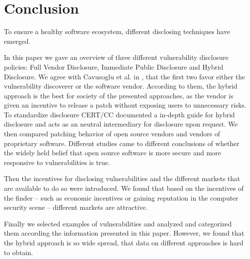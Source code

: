 \section{Conclusion}

To ensure a healthy software ecosystem, different disclosing techniques have emerged.

In this paper we gave an overview of three different vulnerability disclosure
policies: Full Vendor Disclosure, Immediate Public Disclosure and Hybrid
Disclosure.
We agree with Cavusoglu et al. in \cite{Cavusoglu2007}, that the first two favor
either the vulnerability discoverer or the software vendor. 
According to them, the hybrid approach is the best for society of the presented approaches, as the 
vendor is given an incentive to release a patch without exposing users to 
unnecessary risks.
To standardize disclosure CERT/CC documented a in-depth guide for hybrid disclosure and acts as an neutral intermediary for disclosure upon request.
We then compared patching behavior of open source vendors and vendors of proprietary
software. Different studies came to different conclusions of whether the widely
held belief that open source software is more secure and more responsive to
vulnerabilities is true.

Then the incentives for disclosing vulnerabilities and the different markets
that are available to do so were introduced.
We found that based on the incentives of the finder -- such as economic incentives or gaining reputation in the computer security scene --  different markets are attractive.

Finally we selected examples of vulnerabilities and analyzed and categorized
them according the information presented in this paper. However, we found that the hybrid approach is so wide spread, that data on different approaches is hard to obtain.